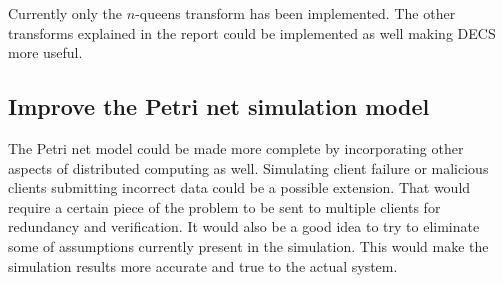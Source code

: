 Currently only the $n$-queens transform has been implemented.
The other transforms explained in the report could be implemented as well making DECS more useful.


\subsection*{Improve the Petri net simulation model}

The Petri net model could be made more complete by incorporating other aspects of distributed computing as well.
Simulating client failure or malicious clients submitting incorrect data could be a possible extension.
That would require a certain piece of the problem to be sent to multiple clients for redundancy and verification.
It would also be a good idea to try to eliminate some of assumptions currently present in the simulation.
This would make the simulation results more accurate and true to the actual system.





